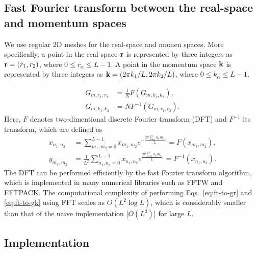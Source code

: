 \documentclass[submission, LectureNotes]{SciPost}
\newcommand{\bk}{\ensuremath{{\bf k}}}
\newcommand{\br}{\ensuremath{{\bf r}}}
\newcommand\ii{\mathrm{i}}%
\newcommand\iv{\ii\nu}%
\begin{document}
\subsection{Fast Fourier transform between the real-space and momentum spaces}
We use regular 2D meshes for the real-space and momen spaces.
More specifically, a point in the real space $\br$ is represented by three integers as
$\br=(r_1, r_2)$, where $0 \le r_\alpha \le L-1$.
A point in the momentum space $\bk$ is represented by three integers as
$\bk=(2\pi k_1/L, 2\pi k_2/L)$, where $0 \le k_\alpha \le L-1$.

\begin{align}
    G_{m,r_1, r_2} &= \frac{1}{N} F(G_{m, k_1, k_2}),\\
    G_{m,k_1, k_2} &= N F^{-1}(G_{m, r_1, r_2}).
\end{align}
Here, $F$ denotes two-dimentional discrete Fourier transform (DFT) and $F^{-1}$ its transform,
which are defined as
\begin{align}
    x_{n_1, n_2} &= \sum_{m_1,m_2=0}^{L-1} x_{m_1,m_2} e^{-\frac{2\pi \sum_\alpha n_\alpha m_\alpha}{L}\ii}= F(x_{m_1, m_2}),\\
    y_{m_1, m_2} &= \frac{1}{L^2} \sum_{n_1,n_2=0}^{L-1} x_{n_1,n_2} e^{\frac{2\pi \sum_\alpha n_\alpha m_\alpha}{L}\ii} = F^{-1}(x_{n_1, n_2}).
\end{align}
The DFT can be performed efficiently by the fast Fourier transform algorithm,
which is implemented in many numerical libraries such as FFTW and FFTPACK.
The computational complexity of performing Eqs.~\eqref{eq:ft-to-gr} and \eqref{eq:ft-to-gk} using FFT
scales as $O(L^2 \log L)$,
which is considerably smaller than that of the naive implementation [$O(L^3)$] for large $L$.

\subsection{Implementation}
\end{document}
